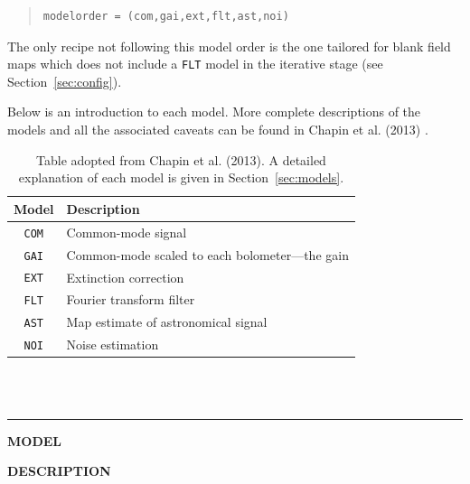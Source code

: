 \documentclass[twoside,11pt]{article}
\newcommand{\htmlref}[2]{#1}
\newcommand{\latexhtml}[2]{#1}
\renewcommand{\_}{\texttt{\symbol{95}}}
\newenvironment{myquote}{\begin{quote}\begin{small}}{\end{small}\end{quote}}
\newcommand{\cref}[3]{\latexhtml{#1~\ref{#2}}{\htmlref{#3}{#2}}}
\begin{document}
\begin{myquote}
\begin{verbatim}
modelorder = (com,gai,ext,flt,ast,noi)
\end{verbatim}
\end{myquote}

The only recipe not following this model order is the one tailored for
blank field maps which does not include a \texttt{FLT} model in the
iterative stage (see \cref{Section}{sec:config}{Specialised
configuration files}).

Below is an introduction to each model. More complete descriptions of the
models and all the associated caveats can be found in Chapin et al.
(2013) \cite{mapmaker}.
\begin{htmlonly}
\setlength{\extrarowheight}{3pt}
\begin{table}[t!]
\centering
\begin{tabular}{c|l}
\hline
\textbf{Model} &\hspace{0.2cm} \textbf{Description} \\
\hline
\texttt{COM}&\hspace{0.2cm} Common-mode signal\\
\texttt{GAI}&\hspace{0.2cm} Common-mode scaled to each bolometer---the gain\\
\texttt{EXT}&\hspace{0.2cm} Extinction correction\\
\texttt{FLT}&\hspace{0.2cm} Fourier transform filter\\
\texttt{AST}&\hspace{0.2cm} Map estimate of astronomical signal\\
\texttt{NOI}&\hspace{0.2cm} Noise estimation\\
\hline
\end{tabular}
\label{tab:mods}
\caption{\small Table adopted from Chapin et al. (2013). A detailed
explanation of each model is given in \cref{Section}{sec:models}{The individual models}.}
\end{table}
\end{htmlonly}
\\ \\
\hrule
\begin{minipage}[t]{0.12\linewidth}
\centering\textbf{MODEL}
\end{minipage}
\begin{minipage}[t]{0.88\linewidth}
\centering\textbf{DESCRIPTION}
\vspace{6pt}
\end{minipage}
\end{document}
